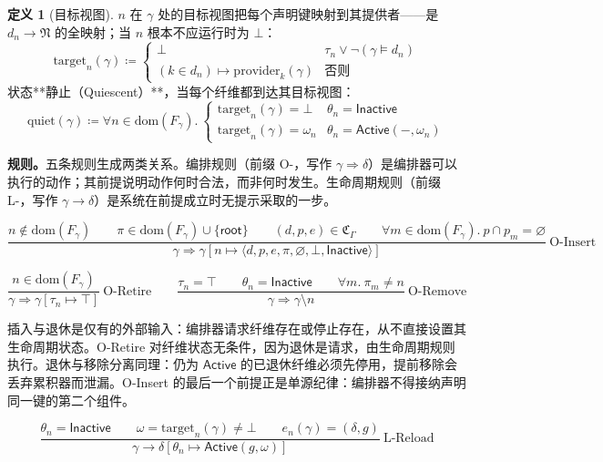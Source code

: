 \documentclass[11pt,a4paper]{article}
\theoremstyle{plain}
\theoremstyle{definition}
\newtheorem{definition}{定义}
\theoremstyle{remark}
\begin{document}
\begin{definition}[目标视图]
$n$ 在 $\gamma$ 处的目标视图把每个声明键映射到其提供者——是 $d_n \to \mathfrak{N}$ 的全映射；当 $n$ 根本不应运行时为 $\bot$：
\[
\mathrm{target}_n(\gamma) \coloneqq \begin{cases}
\bot & \tau_n \vee \neg(\gamma \models d_n) \\
(k \in d_n) \mapsto \mathrm{provider}_k(\gamma) & \text{否则}
\end{cases} \tag{41}
\]
状态**静止（Quiescent）**，当每个纤维都到达其目标视图：
\[
\mathrm{quiet}(\gamma) \coloneqq \forall n \in \mathrm{dom}(F_\gamma).\ \begin{cases}
\mathrm{target}_n(\gamma) = \bot & \theta_n = \mathsf{Inactive} \\
\mathrm{target}_n(\gamma) = \omega_n & \theta_n = \mathsf{Active}(-,\omega_n)
\end{cases} \tag{42}
\]
\end{definition}

\textbf{规则。}五条规则生成两类关系。编排规则（前缀 O-，写作 $\gamma \Rightarrow \delta$）是编排器可以执行的动作；其前提说明动作何时合法，而非何时发生。生命周期规则（前缀 L-，写作 $\gamma \longrightarrow \delta$）是系统在前提成立时无提示采取的一步。

\[
\frac{n \notin \mathrm{dom}(F_\gamma) \qquad \pi \in \mathrm{dom}(F_\gamma) \cup \{\mathsf{root}\} \qquad (d,p,e) \in \mathfrak{C}_\Gamma \qquad \forall m \in \mathrm{dom}(F_\gamma).\ p \cap p_m = \varnothing}
{\gamma \Rightarrow \gamma[n \mapsto \langle d,p,e,\pi,\varnothing,\bot,\mathsf{Inactive}\rangle]}\ \text{O-Insert}
\]

\[
\frac{n \in \mathrm{dom}(F_\gamma)}{\gamma \Rightarrow \gamma[\tau_n \mapsto \top]}\ \text{O-Retire}
\qquad
\frac{\tau_n = \top \qquad \theta_n = \mathsf{Inactive} \qquad \forall m.\ \pi_m \neq n}{\gamma \Rightarrow \gamma \setminus n}\ \text{O-Remove}
\]

插入与退休是仅有的外部输入：编排器请求纤维存在或停止存在，从不直接设置其生命周期状态。O-Retire 对纤维状态无条件，因为退休是请求，由生命周期规则执行。退休与移除分离同理：仍为 $\mathsf{Active}$ 的已退休纤维必须先停用，提前移除会丢弃累积器而泄漏。O-Insert 的最后一个前提正是单源纪律：编排器不得接纳声明同一键的第二个组件。

\[
\frac{\theta_n = \mathsf{Inactive} \qquad \omega = \mathrm{target}_n(\gamma) \neq \bot \qquad e_n(\gamma) = (\delta, g)}
{\gamma \longrightarrow \delta[\theta_n \mapsto \mathsf{Active}(g, \omega)]}\ \text{L-Reload}
\]
\end{document}

